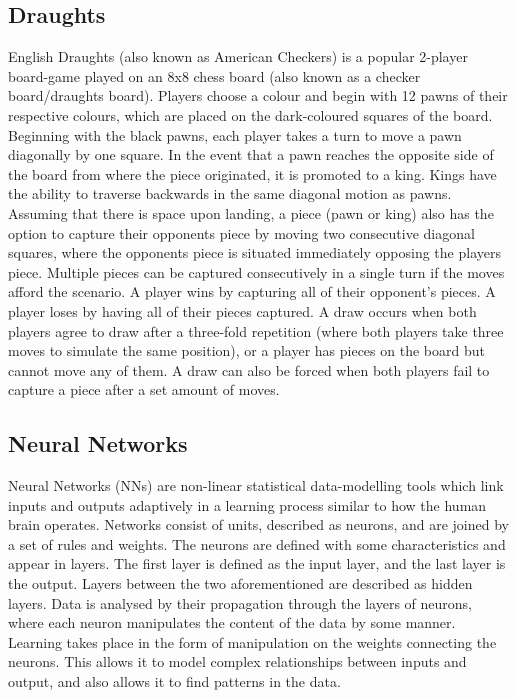 \documentclass[12pt,a4paper]{article}
\begin{document}
    \subsection{Draughts}

    English Draughts (also known as American Checkers) is a popular 2-player board-game played on an 8x8 chess board (also known as a checker board/draughts board). Players choose a colour and begin with 12 pawns of their respective colours, which are placed on the dark-coloured squares of the board. Beginning with the black pawns, each player takes a turn to move a pawn diagonally by one square. In the event that a pawn reaches the opposite side of the board from where the piece originated, it is promoted to a king. Kings have the ability to traverse backwards in the same diagonal motion as pawns. Assuming that there is space upon landing, a piece (pawn or king) also has the option to capture their opponents piece by moving two consecutive diagonal squares, where the opponents piece is situated immediately opposing the players piece. Multiple pieces can be captured consecutively in a single turn if the moves afford the scenario. A player wins by capturing all of their opponent's pieces. A player loses by having all of their pieces captured. A draw occurs when both players agree to draw after a three-fold repetition (where both players take three moves to simulate the same position), or a player has pieces on the board but cannot move any of them. A draw can also be forced when both players fail to capture a piece after a set amount of moves.

    \subsection{Neural Networks}

    Neural Networks (NNs) are non-linear statistical data-modelling tools which link inputs and outputs adaptively in a learning process similar to how the human brain operates. Networks consist of units, described as neurons, and are joined by a set of rules and weights. The neurons are defined with some characteristics and appear in layers. The first layer is defined as the input layer, and the last layer is the output. Layers between the two aforementioned are described as hidden layers. Data is analysed by their propagation through the layers of neurons, where each neuron manipulates the content of the data by some manner. Learning takes place in the form of manipulation on the weights connecting the neurons. This allows it to model complex relationships between inputs and output, and also allows it to find patterns in the data. 
\end{document}
